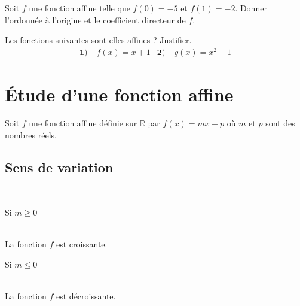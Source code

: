\documentclass[11pt]{article}
\begin{document}
\begin{app}
  Soit $f$ une fonction affine telle que $f(0)=-5$ et $f(1)=-2$. Donner
  l'ordonnée à l'origine et le coefficient directeur de $f$.
\end{app}

\begin{app}
  Les fonctions suivantes sont-elles affines ? Justifier.
  \begin{align*}
    \textbf{1)}\;& f(x) = x+1 &
    \textbf{2)}\;& g(x) = x^2 - 1
  \end{align*}
\end{app}



\newpage
\section{Étude d'une fonction affine}

Soit $f$ une fonction affine définie sur $\mathbb{R}$ par $f(x)=mx+p$ où $m$ et
$p$ sont des nombres réels.


\subsection{Sens de variation}
\begin{prop}~\\[-5mm]
  \begin{minipage}[]{.5\textwidth}
    \begin{center}
      {\LARGE Si $m\geq0$}
    \end{center}~\\[-7mm]
      La fonction $f$ est croissante.
    \begin{center}
    \end{center}
  \end{minipage}
  \begin{minipage}[]{.5\textwidth}
    \begin{center}
      {\LARGE Si $m\leq0$}
    \end{center}~\\[-7mm]
      La fonction $f$ est décroissante.
    \begin{center}
    \end{center}

  \end{minipage}
\end{prop}
\end{document}
